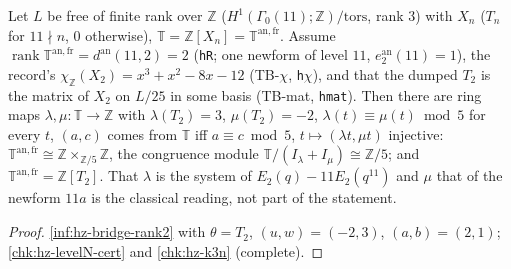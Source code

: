 \begin{theorem}\label{chk:hz-T3}
  \leanok
  Let $L$ be free of finite rank over $\mathbb Z$ ($H^1(\Gamma_0(11);\mathbb Z)/\mathrm{tors}$, rank $3$) with $X_n$ ($T_n$ for $11\nmid n$, $0$
  otherwise), $\mathbb T=\mathbb Z[X_n]=\mathbb T^{\mathrm{an,fr}}$. Assume $\operatorname{rank}\mathbb T^{\mathrm{an,fr}}=d^{\mathrm{an}}(11,2)=2$
  (\texttt{hR}; one newform of level $11$, $e^{\mathrm{an}}_2(11)=1$), the record's $\chi_{\mathbb Z}(X_2)=x^3+x^2-8x-12$ (TB-$\chi$, \texttt{h$\chi$}),
  and that the dumped $T_2$ is the matrix of $X_2$ on $L/25$ in some basis (TB-mat, \texttt{hmat}). Then there are ring maps
  $\lambda,\mu:\mathbb T\to\mathbb Z$ with $\lambda(T_2)=3$, $\mu(T_2)=-2$, $\lambda(t)\equiv\mu(t)\bmod5$ for every $t$, $(a,c)$ comes from $\mathbb T$
  iff $a\equiv c\bmod5$, $t\mapsto(\lambda t,\mu t)$ injective: $\mathbb T^{\mathrm{an,fr}}\cong\mathbb Z\times_{\mathbb Z/5}\mathbb Z$, the congruence
  module $\mathbb T/(I_\lambda+I_\mu)\cong\mathbb Z/5$; and $\mathbb T^{\mathrm{an,fr}}=\mathbb Z[T_2]$. That $\lambda$ is the system of
  $E_2(q)-11E_2(q^{11})$ and $\mu$ that of the newform $11a$ is the classical reading, not part of the statement.
\end{theorem}
\begin{proof}
  \leanok
  \ref{inf:hz-bridge-rank2} with $\theta=T_2$, $(u,w)=(-2,3)$, $(a,b)=(2,1)$; \ref{chk:hz-levelN-cert} and \ref{chk:hz-k3n} (complete).
\end{proof}

